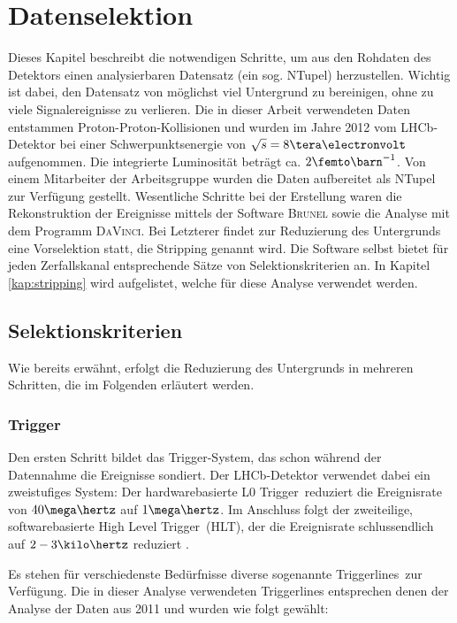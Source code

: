 \chapter{Datenselektion} \label{kap:datenselektion}
Dieses Kapitel beschreibt die notwendigen Schritte, um aus den Rohdaten des Detektors einen analysierbaren Datensatz (ein sog. NTupel) herzustellen. Wichtig ist dabei, den Datensatz von möglichst viel Untergrund zu bereinigen, ohne zu viele Signalereignisse zu verlieren. Die in dieser Arbeit verwendeten Daten entstammen Proton-Proton-Kollisionen und wurden im Jahre 2012 vom LHCb-Detektor bei einer Schwerpunktsenergie von $\sqrt{s} = 8\tera\electronvolt$ aufgenommen. Die integrierte Luminosität beträgt ca. $2\femto\barn^{-1}$. Von einem Mitarbeiter der Arbeitsgruppe wurden die Daten aufbereitet als NTupel zur Verfügung gestellt. Wesentliche Schritte bei der Erstellung waren die Rekonstruktion der Ereignisse mittels der Software \textsc{Brunel} sowie die Analyse mit dem Programm \textsc{DaVinci}. Bei Letzterer findet zur Reduzierung des Untergrunds eine Vorselektion statt, die Stripping genannt wird. Die Software selbst bietet für jeden Zerfallskanal entsprechende Sätze von Selektionskriterien an. In Kapitel \ref{kap:stripping} wird aufgelistet, welche für diese Analyse verwendet werden.

\section{Selektionskriterien}
Wie bereits erwähnt, erfolgt die Reduzierung des Untergrunds in mehreren Schritten, die im Folgenden erläutert werden.

\subsection{Trigger} \label{kap:trigger}
Den ersten Schritt bildet das Trigger-System, das schon während der Datennahme die Ereignisse sondiert. Der LHCb-Detektor verwendet dabei ein zweistufiges System: Der hardwarebasierte \glqq L0 Trigger\grqq\ reduziert die Ereignisrate von $40\mega\hertz$ auf $1\mega\hertz$. Im Anschluss folgt der zweiteilige, softwarebasierte \glqq High Level Trigger\grqq\ (HLT), der die Ereignisrate schlussendlich auf $2-3\kilo\hertz$ reduziert \cite{trigger}.

Es stehen für verschiedenste Bedürfnisse diverse sogenannte \glqq Triggerlines\grqq\ zur Verfügung. Die in dieser Analyse verwendeten Triggerlines entsprechen denen der Analyse der Daten aus 2011 \cite{lhcb-paper} und wurden wie folgt gewählt:

